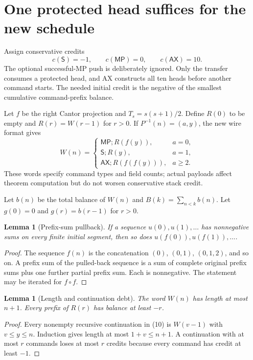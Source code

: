 \documentclass[11pt]{article}
\newtheorem{lemma}[theorem]{Lemma}
\newcommand{\AX}{\mathsf{AX}}
\newcommand{\MP}{\mathsf{MP}}
\newcommand{\SSS}{\mathsf S}
\begin{document}
\section{One protected head suffices for the new schedule}
\label{sec:credit}

Assign conservative credits
\[
 c(\SSS)=-1,\qquad c(\MP)=0,\qquad c(\AX)=10.
\]
The optional successful-MP push is deliberately ignored. Only the transfer consumes a protected head, and AX constructs all ten heads before another command starts. The needed initial credit is the negative of the smallest cumulative command-prefix balance.

Let $f$ be the right Cantor projection and $T_s=s(s+1)/2$. Define $R(0)$ to be empty and $R(r)=W(r-1)$ for $r>0$. If $P^{-1}(n)=(a,y)$, the new wire format gives
\[
 W(n)=
 \begin{cases}
  \MP;R(f(y)),&a=0,\\
  \SSS;R(y),&a=1,\\
  \AX;R(f(f(y))),&a\ge2.
 \end{cases}                                                    \tag{10}
\]
These words specify command types and field counts; actual payloads affect theorem computation but do not worsen conservative stack credit.

Let $b(n)$ be the total balance of $W(n)$ and $B(k)=\sum_{n<k}b(n)$. Let $g(0)=0$ and $g(r)=b(r-1)$ for $r>0$.

\begin{lemma}[Prefix-sum pullback]
If a sequence $u(0),u(1),\ldots$ has nonnegative sums on every finite initial segment, then so does $u(f(0)),u(f(1)),\ldots$.
\end{lemma}
\begin{proof}
The sequence $f(n)$ is the concatenation $(0)$, $(0,1)$, $(0,1,2)$, and so on. A prefix sum of the pulled-back sequence is a sum of complete original prefix sums plus one further partial prefix sum. Each is nonnegative. The statement may be iterated for $f\circ f$.
\end{proof}

\begin{lemma}[Length and continuation debt]
The word $W(n)$ has length at most $n+1$. Every prefix of $R(r)$ has balance at least $-r$.
\end{lemma}
\begin{proof}
Every nonempty recursive continuation in (10) is $W(v-1)$ with $v\le y\le n$. Induction gives length at most $1+v\le n+1$. A continuation with at most $r$ commands loses at most $r$ credits because every command has credit at least $-1$.
\end{proof}
\end{document}
